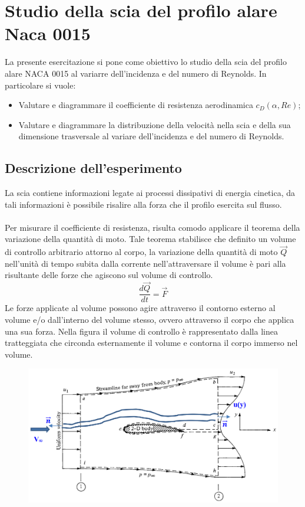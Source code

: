 \section{Studio della scia del profilo alare Naca 0015}
La presente esercitazione si pone come obiettivo lo studio della scia del profilo alare NACA 0015 al variarre dell'incidenza e del numero di Reynolds. In particolare si vuole:
\begin{itemize}
    \item Valutare e diagrammare il coefficiente di resistenza aerodinamica $c_D(\alpha, Re)$;
    \item Valutare e diagrammare la distribuzione della velocità nella scia e della sua dimensione trasversale al variare dell'incidenza e del numero di Reynolds.
\end{itemize}

\subsection{Descrizione dell'esperimento}
La scia contiene informazioni legate ai processi dissipativi di energia cinetica, da tali informazioni è possibile risalire alla forza che il profilo esercita sul flusso.\\\\
Per misurare il coefficiente di resistenza, risulta comodo applicare il teorema della variazione della quantità di moto. Tale teorema stabilisce che definito un volume di controllo arbitrario attorno al corpo, la variazione della quantità di moto $\vec Q$ nell'unità di tempo subita dalla corrente nell'attraversare il volume è pari alla risultante delle forze che agiscono sul volume di controllo.
\begin{equation*}
    \frac{d\vec Q}{dt} = \vec{F}
\end{equation*}
Le forze applicate al volume possono agire attraverso il contorno esterno al volume e/o dall'interno del volume stesso, ovvero attraverso il corpo che applica una sua forza. Nella figura il volume di controllo è rappresentato dalla linea tratteggiata che circonda esternamente il volume e contorna il corpo immerso nel volume.
\begin{figure}[H]
    \centering
    \includegraphics[width=.8\textwidth]{images/6/thqdm.png}
\end{figure}

